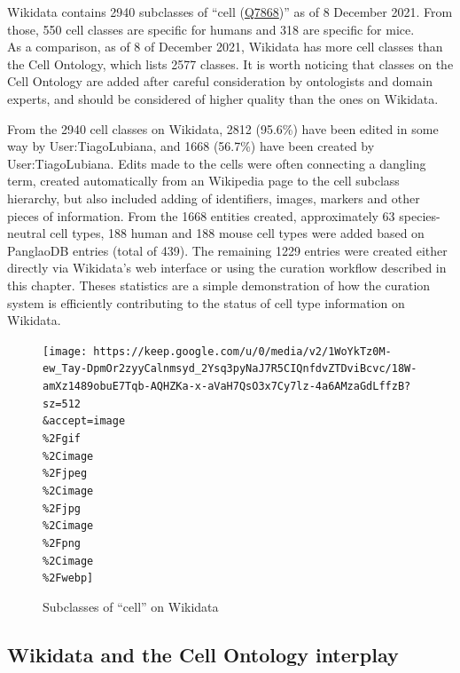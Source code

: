 Wikidata contains 2940 subclasses of ``cell (\href{https://www.wikidata.org/wiki/Q7868}{Q7868})'' as of 8 December 2021.
From those, 550 cell classes are specific for humans and 318 are specific for mice.\\
As a comparison, as of 8 of December 2021, Wikidata has more cell classes than the Cell Ontology, which lists 2577 classes.
It is worth noticing that classes on the Cell Ontology are added after careful consideration by ontologists and domain experts, and should be considered of higher quality than the ones on Wikidata.

From the 2940 cell classes on Wikidata, 2812 (95.6\%) have been edited in some way by User:TiagoLubiana, and 1668 (56.7\%) have been created by User:TiagoLubiana.
Edits made to the cells were often connecting a dangling term, created automatically from an Wikipedia page to the cell subclass hierarchy, but also included adding of identifiers, images, markers and other pieces of information.
From the 1668 entities created, approximately 63 species-neutral cell types, 188 human and 188 mouse cell types were added based on PanglaoDB entries (total of 439).
The remaining 1229 entries were created either directly via Wikidata's web interface or using the curation workflow described in this chapter.
Theses statistics are a simple demonstration of how the curation system is efficiently contributing to the status of cell type information on Wikidata.

\begin{figure}
\hypertarget{fig:subclass_of_cell}{%
\centering
\texttt{[image: https://keep.google.com/u/0/media/v2/1WoYkTz0M-ew\_Tay-DpmOr2zyyCalnmsyd\_2Ysq3pyNaJ7R5CIQnfdvZTDviBcvc/18W-amXz1489obuE7Tqb-AQHZKa-x-aVaH7QsO3x7Cy7lz-4a6AMzaGdLffzB?sz=512\\\&accept=image\\\%2Fgif\\\%2Cimage\\\%2Fjpeg\\\%2Cimage\\\%2Fjpg\\\%2Cimage\\\%2Fpng\\\%2Cimage\\\%2Fwebp]}
\caption{Subclasses of ``cell'' on Wikidata}\label{fig:subclass_of_cell}
}
\end{figure}

\hypertarget{wikidata-and-the-cell-ontology-interplay}{%
\subsection{Wikidata and the Cell Ontology interplay}\label{wikidata-and-the-cell-ontology-interplay}}

